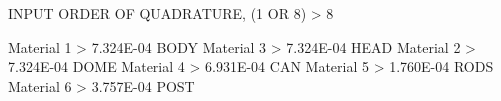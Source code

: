 INPUT ORDER OF QUADRATURE, (1 OR 8) > 8

  Material  1 > 7.324E-04  BODY
  Material  3 > 7.324E-04  HEAD
  Material  2 > 7.324E-04  DOME
  Material  4 > 6.931E-04  CAN
  Material  5 > 1.760E-04  RODS
  Material  6 > 3.757E-04  POST 
